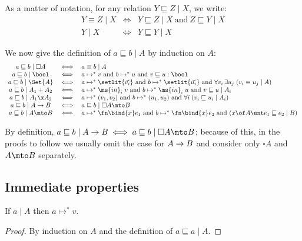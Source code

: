 \documentclass{article}
\renewcommand{\land}{~\text{and}~}
\newcommand{\ale}{\sqsubseteq}
\newcommand{\aeq}{\equiv}
\newcommand{\step}{\mapsto}
\newcommand{\steps}{\step^*}
\newcommand{\disc}[1]{\square{#1}}
\newcommand{\lr}[2]{#2\mathrel{|}#1}
\newcommand{\lrcx}[3]{#1 \ent \lr{#2}{#3}}
\begin{document}
As a matter of notation, for any relation $\lr{X}{Y \ale Z}$, we write:
\[\begin{array}{ccl}
  \lr{X}{Y \aeq Z} &\iff& \lr{X}{Y \ale Z} \land \lr{X}{Z \ale Y}\\
  \lr{X}{Y}     &\iff& \lr{X}{Y \ale Y}
\end{array}\]

We now give the definition of $\lr{A}{a \ale b}$ by induction on $A$:
\[\begin{array}{ccl}
  \lr{\disc{A}}{a \ale b} &\iff& \lr{A}{a \aeq b}\\
  \lr{\bool}{a \ale b} &\iff&
  a \steps v \land b \steps u \land v \ale u : \bool\\
  \lr{\Set{A}}{a \ale b} &\iff&
  a \steps \setlit{\vec{v_i}} \land b \steps \setlit{\vec{u_i}}
  \land \forall v_i\,\exists u_j\; (\lr{A}{v_i \aeq u_j})\\
  \lr{A_1 + A_2}{a \ale b} &\iff&
  a \steps \ms{in}_i\;v \land b \steps \ms{in}_i\;u \land \lr{A_i}{v \ale u}\\
  \lr{A_1 \x A_2}{a \ale b} &\iff&
  a \steps (v_1, v_2) \land b \steps (u_1, u_2)
  \land \forall i\; (\lr{A_i}{v_i \ale u_i})\\
  \lr{A \to B}{a \ale b} &\iff& \lr{\disc{A} \mto B}{a \ale b}\\
  \lr{A \mto B}{a \ale b} &\iff&
  a \steps \fn\bind{x} e_1 \land b \steps \fn\bind{x} e_2
  \land (\lrcx{x\of A}{B}{e_1 \ale e_2})
\end{array}\]

By definition, $\lr{A \uto B}{a \ale b} \iff \lr{\disc{A} \mto B}{a \ale b}$;
because of this, in the proofs to follow we usually omit the case for $A \to B$
and consider only $\disc{A}$ and $A \mto B$ separately.


\subsection{Immediate properties}

\begin{theorem}[Termination]\label{thm:termination}
  If $\lr{A}{a}$ then $a \steps v$.
\end{theorem}

\begin{proof}
  By induction on $A$ and the definition of $\lr{A}{a \ale a}$.
\end{proof}
\end{document}
